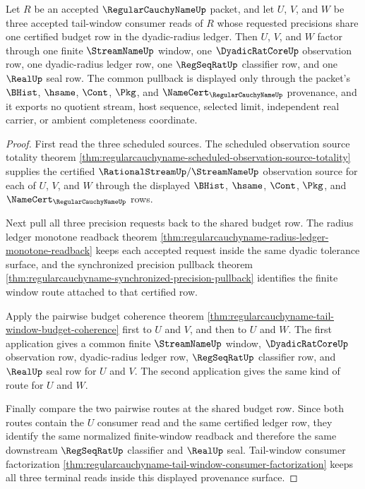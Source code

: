 \begin{theorem}
\label{thm:regularcauchyname-shared-budget-triple-pullback}
Let $R$ be an accepted $\RegularCauchyNameUp$ packet, and let $U$, $V$, and $W$ be three accepted tail-window consumer reads of $R$ whose requested precisions share one certified budget row in the dyadic-radius ledger. Then $U$, $V$, and $W$ factor through one finite $\StreamNameUp$ window, one $\DyadicRatCoreUp$ observation row, one dyadic-radius ledger row, one $\RegSeqRatUp$ classifier row, and one $\RealUp$ seal row. The common pullback is displayed only through the packet's $\BHist$, $\hsame$, $\Cont$, $\Pkg$, and $\NameCert_{\RegularCauchyNameUp}$ provenance, and it exports no quotient stream, host sequence, selected limit, independent real carrier, or ambient completeness coordinate.
\end{theorem}
\begin{proof}
First read the three scheduled sources. The scheduled observation source totality theorem \autoref{thm:regularcauchyname-scheduled-observation-source-totality} supplies the certified $\RationalStreamUp/\StreamNameUp$ observation source for each of $U$, $V$, and $W$ through the displayed $\BHist$, $\hsame$, $\Cont$, $\Pkg$, and $\NameCert_{\RegularCauchyNameUp}$ rows.

Next pull all three precision requests back to the shared budget row. The radius ledger monotone readback theorem \autoref{thm:regularcauchyname-radius-ledger-monotone-readback} keeps each accepted request inside the same dyadic tolerance surface, and the synchronized precision pullback theorem \autoref{thm:regularcauchyname-synchronized-precision-pullback} identifies the finite window route attached to that certified row.

Apply the pairwise budget coherence theorem \autoref{thm:regularcauchyname-tail-window-budget-coherence} first to $U$ and $V$, and then to $U$ and $W$. The first application gives a common finite $\StreamNameUp$ window, $\DyadicRatCoreUp$ observation row, dyadic-radius ledger row, $\RegSeqRatUp$ classifier row, and $\RealUp$ seal row for $U$ and $V$. The second application gives the same kind of route for $U$ and $W$.

Finally compare the two pairwise routes at the shared budget row. Since both routes contain the $U$ consumer read and the same certified ledger row, they identify the same normalized finite-window readback and therefore the same downstream $\RegSeqRatUp$ classifier and $\RealUp$ seal. Tail-window consumer factorization \autoref{thm:regularcauchyname-tail-window-consumer-factorization} keeps all three terminal reads inside this displayed provenance surface.
\end{proof}

